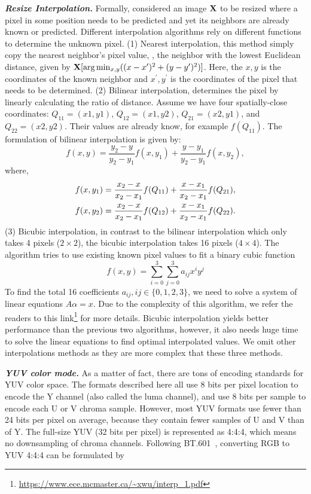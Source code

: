 \textbf{\emph{Resize Interpolation.}} Formally, considered an image ${\mathbf{X}}$ to be resized where a pixel in some position needs to be predicted and yet its neighbors are already known or predicted. Different interpolation algorithms rely on different functions to determine the unknown pixel. (1) Nearest interpolation, this method simply copy the nearest neighbor's pixel value, \ie, the neighbor with the lowest Euclidean distance, given by ${\mathbf{X}}[\arg\min_{x, y}((x-x^{\prime})^2 +(y-y^{\prime})^2 )]$. Here, the $x, y$ is the coordinates of the known neighbor and $x^{\prime}, y^{\prime}$ is the coordinates of the pixel that needs to be determined. (2) Bilinear interpolation, determines the pixel by linearly calculating the ratio of distance. Assume we have four spatially-close coordinates:  $Q_{11} = (x1, y1)$, $Q_{12} = (x1, y2)$, $Q_{21} = (x2, y1)$, and $Q_{22} = (x2, y2)$. Their values are already know, for example $f(Q_{11})$. The formulation of bilinear interpolation is given by:
\begin{equation}
    f(x, y) = \frac{y_2 - y}{y_2 - y_1}f(x, y_1) + \frac{y - y_1}{y_2 - y_1}f(x, y_2),
\end{equation}
where,
\begin{align}
    f(x, y_1) &= \frac{x_2 - x}{x_2 - x_1}f(Q_{11}) + \frac{x - x_1}{x_2 - x_1}f(Q_{21}), \notag \\
    f(x, y_2) &= \frac{x_2 - x}{x_2 - x_1}f(Q_{12}) + \frac{x - x_1}{x_2 - x_1}f(Q_{22}). \notag
\end{align}
(3) Bicubic interpolation, in contrast to the bilinear interpolation which only takes 4 pixels ($2\times 2$), the bicubic interpolation takes 16 pixels ($4\times 4$). The algorithm tries to use existing known pixel values to fit a binary cubic function
\begin{equation}
    f(x, y) = \sum_{i=0}^3 \sum_{j=0}^3 a_{ij}x^iy^j
\end{equation}
To find the total 16 coefficients $a_{ij}, ij\in\{0,1,2,3\}$, we need to solve a system of linear equations $A\alpha=x$. Due to the complexity of this algorithm, we refer the readers to this link\footnote{\url{https://www.ece.mcmaster.ca/~xwu/interp_1.pdf}} for more details. Bicubic interpolation yields better performance than the previous two algorithms, however, it also needs huge time to solve the linear equations to find optimal interpolated values. We omit other interpolations methods as they are more complex that these three methods. 

\textbf{\emph{YUV color mode.}} As a matter of fact, there are tons of encoding standards for YUV color space. The formats described here all use 8 bits per pixel location to encode the Y channel (also called the luma channel), and use 8 bits per sample to encode each U or V chroma sample. However, most YUV formats use fewer than 24 bits per pixel on average, because they contain fewer samples of U and V than of Y. The full-size YUV (32 bits per pixel) is represented as 4:4:4, which means no downsampling of chroma channels. Following BT.601~\cite{rec1993bt}, converting RGB to YUV 4:4:4 can be formulated by 

